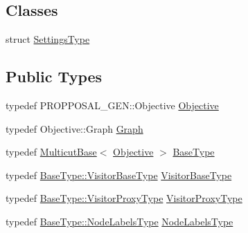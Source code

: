 \subsection*{Classes}
\begin{DoxyCompactItemize}
\item 
struct \hyperlink{structnifty_1_1graph_1_1optimization_1_1multicut_1_1FusionMoveBased_1_1SettingsType}{Settings\+Type}
\end{DoxyCompactItemize}
\subsection*{Public Types}
\begin{DoxyCompactItemize}
\item 
typedef P\+R\+O\+P\+P\+O\+S\+A\+L\+\_\+\+G\+E\+N\+::\+Objective \hyperlink{classnifty_1_1graph_1_1optimization_1_1multicut_1_1FusionMoveBased_a2777aaf3d5422e4a4ce78c8cd63683a6}{Objective}
\item 
typedef Objective\+::\+Graph \hyperlink{classnifty_1_1graph_1_1optimization_1_1multicut_1_1FusionMoveBased_aa08cbfeb0fe2864bc6c4150d1fe09c7f}{Graph}
\item 
typedef \hyperlink{classnifty_1_1graph_1_1optimization_1_1multicut_1_1MulticutBase}{Multicut\+Base}$<$ \hyperlink{classnifty_1_1graph_1_1optimization_1_1multicut_1_1FusionMoveBased_a2777aaf3d5422e4a4ce78c8cd63683a6}{Objective} $>$ \hyperlink{classnifty_1_1graph_1_1optimization_1_1multicut_1_1FusionMoveBased_addd6a4fdac30fe785caa17acd3204426}{Base\+Type}
\item 
typedef \hyperlink{classnifty_1_1graph_1_1optimization_1_1common_1_1SolverBase_a5a14d64c70a9cc0eebc7d71d2b089f9b}{Base\+Type\+::\+Visitor\+Base\+Type} \hyperlink{classnifty_1_1graph_1_1optimization_1_1multicut_1_1FusionMoveBased_acd87e9e95cad3e7faa128fe8a2bbd651}{Visitor\+Base\+Type}
\item 
typedef \hyperlink{classnifty_1_1graph_1_1optimization_1_1common_1_1SolverBase_a58913ea9ab9232ff72608b710c1012d0}{Base\+Type\+::\+Visitor\+Proxy\+Type} \hyperlink{classnifty_1_1graph_1_1optimization_1_1multicut_1_1FusionMoveBased_ae1d6db357008989be58be404480ebbcd}{Visitor\+Proxy\+Type}
\item 
typedef \hyperlink{classnifty_1_1graph_1_1optimization_1_1common_1_1SolverBase_a6e4e465f3b6e039882669fcfb9714818}{Base\+Type\+::\+Node\+Labels\+Type} \hyperlink{classnifty_1_1graph_1_1optimization_1_1multicut_1_1FusionMoveBased_a115c36aa582fbffc94eea3079d566122}{Node\+Labels\+Type}
\item 

\end{DoxyCompactItemize}
